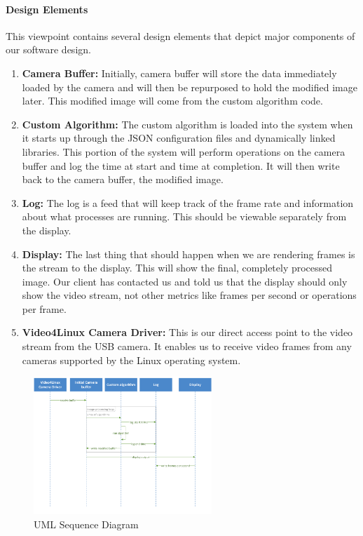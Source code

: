 	\paragraph{Design Elements}
	This viewpoint contains several design elements that depict major components of our software design.\\
	
	\begin{enumerate}[leftmargin=2cm,labelindent=2cm]
	\item \textbf{Camera Buffer:}
	Initially, camera buffer will store the data immediately loaded by the camera and will then be repurposed to hold the modified image later. This 		modified image will come from the custom algorithm code.

	\item \textbf{Custom Algorithm:}
	The custom algorithm is loaded into the system when it starts up through the JSON configuration files and dynamically linked libraries. This 		portion of the system will perform operations on the camera buffer and log the time at start and time at completion. It will then write back to the 		camera buffer, the modified image.

	\item \textbf{Log:}
	The log is a feed that will keep track of the frame rate and information about what processes are running. This should be viewable separately from 	the display.

	\item \textbf{Display:}
	The last thing that should happen when we are rendering frames is the stream to the display. This will show the final, completely processed 		image. Our client has contacted us and told us that the display should only show the video stream, not other metrics like frames per second or 		operations per frame.

	\item \textbf{Video4Linux Camera Driver:}
	This is our direct access point to the video stream from the USB camera. It enables us to receive video frames from any cameras supported by 	the Linux operating system.\\
	\end{enumerate}
	
	\begin{figure}[H] 
		\centering
		\includegraphics[width=0.6\textwidth,natwidth=610,natheight=642]{images/UML_Diagram.png}
		\caption{UML Sequence Diagram}
		\end{figure}
	
